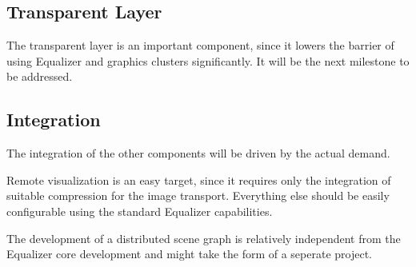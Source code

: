 \documentclass[10pt,a4paper]{scrartcl}
\begin{document}
\subsection{Transparent Layer}
The transparent layer is an important component, since it lowers the
barrier of using Equalizer and graphics clusters significantly. It will
be the next milestone to be addressed.

\subsection{Integration}
The integration of the other components will be driven by the actual
demand. 

Remote visualization is an easy target, since it requires only the
integration of suitable compression for the image transport. Everything
else should be easily configurable using the standard Equalizer
capabilities.

The development of a distributed scene graph is relatively independent
from the Equalizer core development and might take the form of a
seperate project.




\end{document}
